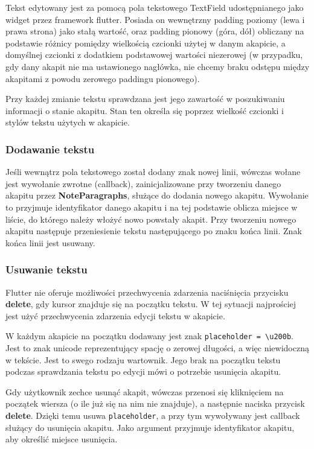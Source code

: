 Tekst edytowany jest za pomocą pola tekstowego TextField udostępnianego jako widget przez framework flutter. Posiada on wewnętrzny padding poziomy (lewa i prawa strona) jako stałą wartość, oraz padding pionowy (góra, dół) obliczany na podstawie różnicy pomiędzy wielkością czcionki użytej w danym akapicie, a domyślnej czcionki z dodatkiem podstawowej wartości niezerowej (w przypadku, gdy dany akapit nie ma ustawionego nagłówka, nie chcemy braku odstępu między akapitami z powodu zerowego paddingu pionowego).

Przy każdej zmianie tekstu sprawdzana jest jego zawartość w poszukiwaniu informacji o stanie akapitu. Stan ten określa się poprzez wielkość czcionki i stylów tekstu użytych w akapicie.

\subsubsection{Dodawanie tekstu}

Jeśli wewnątrz pola tekstowego został dodany znak nowej linii, wówczas wołane jest wywołanie zwrotne (callback), zainicjalizowane przy tworzeniu danego akapitu przez \textbf{NoteParagraphs}, służące do dodania nowego akapitu. Wywołanie to przyjmuje identyfikator danego akapitu i na tej podstawie oblicza miejsce w liście, do którego należy włożyć nowo powstały akapit. Przy tworzeniu nowego akapitu następuje przeniesienie tekstu następującego po znaku końca linii. Znak końca linii jest usuwany.

\subsubsection{Usuwanie tekstu}
\label{eq:usuwanieTekstu}

Flutter nie oferuje możliwości przechwycenia zdarzenia naciśnięcia przycisku \textbf{delete}, gdy kursor znajduje się na początku tekstu. W tej sytuacji najprościej jest użyć przechwycenia zdarzenia edycji tekstu w akapicie.

W każdym akapicie na początku dodawany jest znak \verb|placeholder = \u200b|. Jest to znak unicode reprezentujący spację o zerowej długości, a więc niewidoczną w tekście. Jest to swego rodzaju wartownik. Jego brak na początku tekstu podczas sprawdzania tekstu po edycji mówi o potrzebie usunięcia akapitu.

Gdy użytkownik zechce usunąć akapit, wówczas przenosi się kliknięciem na początek wiersza (o ile już się na nim nie znajduje), a następnie naciska przycisk \textbf{delete}. Dzięki temu usuwa \verb|placeholder|, a przy tym wywoływany jest callback służący do usunięcia akapitu. Jako argument przyjmuje identyfikator akapitu, aby określić miejsce usunięcia.

